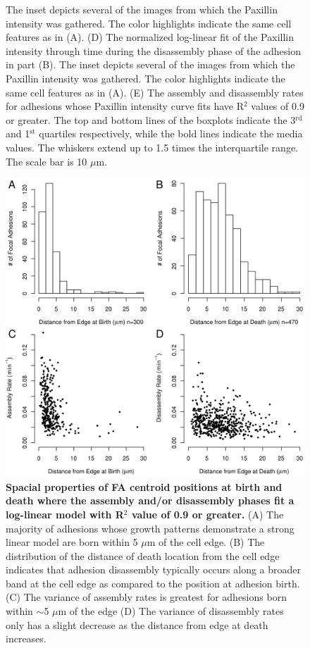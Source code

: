 \begin{figure}[htbp]
{The inset depicts several of the images from which the Paxillin intensity was
gathered. The color highlights indicate the same cell features as in (A). (D)
The normalized log-linear fit of the Paxillin intensity through time during the
disassembly phase of the adhesion in part (B). The inset depicts several of the
images from which the Paxillin intensity was gathered. The color highlights
indicate the same cell features as in (A). (E) The assembly and disassembly
rates for adhesions whose Paxillin intensity curve fits have R$^2$ values of 0.9
or greater. The top and bottom lines of the boxplots indicate the 3$^\text{rd}$
and 1$^\text{st}$ quartiles respectively, while the bold lines indicate the
media values. The whiskers extend up to 1.5 times the interquartile range. The
scale bar is 10 $\mu$m.
}
\label{kinetics}
\end{figure}

\begin{figure}[htbp]
\begin{center}
\includegraphics[width=\textwidth]{../figures/spatial/spatial}
\end{center}
\caption{
{\bf Spacial properties of FA centroid positions at birth and death where the
assembly and/or disassembly phases fit a log-linear model with R$^2$ value of
0.9 or greater.} (A) The majority of adhesions whose growth patterns demonstrate
a strong linear model are born within 5 $\mu$m of the cell edge. (B) The
distribution of the distance of death location from the cell edge indicates that
adhesion disassembly typically occurs along a broader band at the cell edge as
compared to the position at adhesion birth. (C) The variance of assembly rates
is greatest for adhesions born within $\sim$5 $\mu$m of the edge (D) The
variance of disassembly rates only has a slight decrease as the distance from
edge at death increases.  
}
\label{spatial}
\end{figure}

